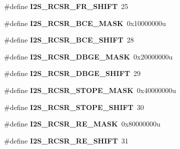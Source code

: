 \begin{DoxyCompactItemize}
\item 
\#define {\bfseries I2\+S\+\_\+\+R\+C\+S\+R\+\_\+\+F\+R\+\_\+\+S\+H\+I\+FT}~25\hypertarget{group__I2S__Register__Masks_gafee534215dedadf1826ad34193850dca}{}\label{group__I2S__Register__Masks_gafee534215dedadf1826ad34193850dca}

\item 
\#define {\bfseries I2\+S\+\_\+\+R\+C\+S\+R\+\_\+\+B\+C\+E\+\_\+\+M\+A\+SK}~0x10000000u\hypertarget{group__I2S__Register__Masks_ga54ae667249649209bb97b5bbbc5fd782}{}\label{group__I2S__Register__Masks_ga54ae667249649209bb97b5bbbc5fd782}

\item 
\#define {\bfseries I2\+S\+\_\+\+R\+C\+S\+R\+\_\+\+B\+C\+E\+\_\+\+S\+H\+I\+FT}~28\hypertarget{group__I2S__Register__Masks_ga6db23fcadacc96fdf65ce93ff944c40d}{}\label{group__I2S__Register__Masks_ga6db23fcadacc96fdf65ce93ff944c40d}

\item 
\#define {\bfseries I2\+S\+\_\+\+R\+C\+S\+R\+\_\+\+D\+B\+G\+E\+\_\+\+M\+A\+SK}~0x20000000u\hypertarget{group__I2S__Register__Masks_ga3b612d1b86edf89a8e6c3bfb5a8bce4e}{}\label{group__I2S__Register__Masks_ga3b612d1b86edf89a8e6c3bfb5a8bce4e}

\item 
\#define {\bfseries I2\+S\+\_\+\+R\+C\+S\+R\+\_\+\+D\+B\+G\+E\+\_\+\+S\+H\+I\+FT}~29\hypertarget{group__I2S__Register__Masks_ga631cd411a0272dfbd2cf89390a60ae98}{}\label{group__I2S__Register__Masks_ga631cd411a0272dfbd2cf89390a60ae98}

\item 
\#define {\bfseries I2\+S\+\_\+\+R\+C\+S\+R\+\_\+\+S\+T\+O\+P\+E\+\_\+\+M\+A\+SK}~0x40000000u\hypertarget{group__I2S__Register__Masks_ga44e7cececc92de704481e691cf2d07da}{}\label{group__I2S__Register__Masks_ga44e7cececc92de704481e691cf2d07da}

\item 
\#define {\bfseries I2\+S\+\_\+\+R\+C\+S\+R\+\_\+\+S\+T\+O\+P\+E\+\_\+\+S\+H\+I\+FT}~30\hypertarget{group__I2S__Register__Masks_ga6bb5b025ffa2d2916eec0a3fc9a973aa}{}\label{group__I2S__Register__Masks_ga6bb5b025ffa2d2916eec0a3fc9a973aa}

\item 
\#define {\bfseries I2\+S\+\_\+\+R\+C\+S\+R\+\_\+\+R\+E\+\_\+\+M\+A\+SK}~0x80000000u\hypertarget{group__I2S__Register__Masks_gad72205d781328e9b391811123b8e115f}{}\label{group__I2S__Register__Masks_gad72205d781328e9b391811123b8e115f}

\item 
\#define {\bfseries I2\+S\+\_\+\+R\+C\+S\+R\+\_\+\+R\+E\+\_\+\+S\+H\+I\+FT}~31\hypertarget{group__I2S__Register__Masks_gaedda1d8255b891c8abfaf0104a73e6bf}{}\label{group__I2S__Register__Masks_gaedda1d8255b891c8abfaf0104a73e6bf}


\end{DoxyCompactItemize}
